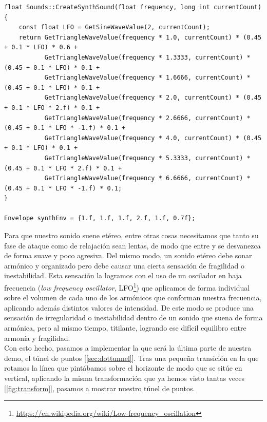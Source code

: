 \begin{lstlisting}[style=C-color, caption={Generación de un sonido etéreo},label=cod:synth]
float Sounds::CreateSynthSound(float frequency, long int currentCount)
{
    const float LFO = GetSineWaveValue(2, currentCount);
    return GetTriangleWaveValue(frequency * 1.0, currentCount) * (0.45 + 0.1 * LFO) * 0.6 +
           GetTriangleWaveValue(frequency * 1.3333, currentCount) * (0.45 + 0.1 * LFO) * 0.1 +
           GetTriangleWaveValue(frequency * 1.6666, currentCount) * (0.45 + 0.1 * LFO) * 0.1 +
           GetTriangleWaveValue(frequency * 2.0, currentCount) * (0.45 + 0.1 * LFO * 2.f) * 0.1 +
           GetTriangleWaveValue(frequency * 2.6666, currentCount) * (0.45 + 0.1 * LFO * -1.f) * 0.1 +
           GetTriangleWaveValue(frequency * 4.0, currentCount) * (0.45 + 0.1 * LFO) * 0.1 +
           GetTriangleWaveValue(frequency * 5.3333, currentCount) * (0.45 + 0.1 * LFO * 2.f) * 0.1 +
           GetTriangleWaveValue(frequency * 6.6666, currentCount) * (0.45 + 0.1 * LFO * -1.f) * 0.1;
}

Envelope synthEnv = {1.f, 1.f, 1.f, 2.f, 1.f, 0.7f};
\end{lstlisting}

Para que nuestro sonido suene etéreo, entre otras cosas necesitamos que tanto su fase de ataque como de relajación sean lentas, de modo que entre y se desvanezca de forma suave y poco agresiva. Del mismo modo, un sonido etéreo debe sonar armónico y organizado pero debe causar una cierta sensación de fragilidad o inestabilidad. Esta sensación la logramos con el uso de un oscilador en baja frecuencia (\emph{low frequency oscillator}, LFO\footnote{\url{https://en.wikipedia.org/wiki/Low-frequency_oscillation}}) que aplicamos de forma individual sobre el volumen de cada uno de los armónicos que conforman nuestra frecuencia, aplicando además distintos valores de intensidad. De este modo se produce una sensación de irregularidad o inestabilidad dentro de un sonido que suena de forma armónica, pero al mismo tiempo, titilante, logrando ese difícil equilibro entre armonía y fragilidad.\\

Con esto hecho, pasamos a implementar la que será la última parte de nuestra demo, el túnel de puntos [\ref{sec:dottunnel}]. Tras una pequeña transición en la que rotamos la línea que pintábamos sobre el horizonte de modo que se sitúe en vertical, aplicando la misma transformación que ya hemos visto tantas veces [\ref{fig:transform}], pasamos a mostrar nuestro túnel de puntos.\\

